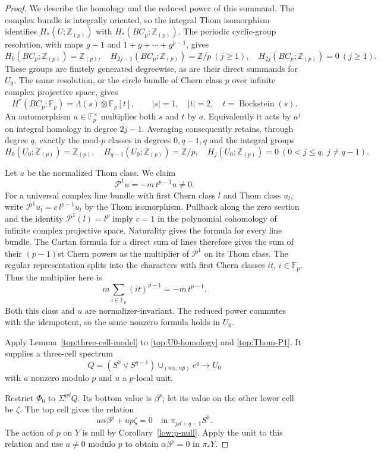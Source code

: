\begin{proof}
We describe the homology and the reduced power of this summand.
The complex bundle is integrally oriented, so the integral Thom
isomorphism identifies $H_*(U;\mathbb Z_{(p)})$ with
$H_*(BC_p;\mathbb Z_{(p)})$. The periodic cyclic-group resolution,
with maps $g-1$ and $1+g+\cdots+g^{p-1}$, gives
\[
 H_0(BC_p;\mathbb Z_{(p)})=\mathbb Z_{(p)},\quad
 H_{2j-1}(BC_p;\mathbb Z_{(p)})=\mathbb Z/p\ (j\geq1),\quad
 H_{2j}(BC_p;\mathbb Z_{(p)})=0\ (j\geq1).
\]
These groups are finitely generated degreewise, as are their
direct summands for $U_0$. The same resolution, or the circle
bundle of Chern class $p$ over infinite complex projective space,
gives
\[
 H^*(BC_p;\mathbb F_p)=\Lambda(s)\otimes\mathbb F_p[t],
 \qquad |s|=1,\quad |t|=2,\quad t=\operatorname{Bockstein}(s).
\]
An automorphism $a\in\mathbb F_p^\times$ multiplies both $s$ and
$t$ by $a$. Equivalently it acts by $a^j$ on integral homology
in degree $2j-1$. Averaging consequently retains, through degree
$q$, exactly the mod-$p$ classes in degrees $0,q-1,q$ and the
integral groups
\begin{equation}
\label{top:U0-homology}
 H_0(U_0;\mathbb Z_{(p)})=\mathbb Z_{(p)},\quad
 H_{q-1}(U_0;\mathbb Z_{(p)})=\mathbb Z/p,
 \quad H_j(U_0;\mathbb Z_{(p)})=0\ (0<j\leq q,\ j\ne q-1).
\end{equation}

Let $u$ be the normalized Thom class. We claim
\begin{equation}
\label{top:Thom-P1}
 \mathcal P^1u=-m\,t^{p-1}u\ne0.
\end{equation}
For a universal complex line bundle with first Chern class $l$
and Thom class $u_l$, write
$\mathcal P^1u_l=c\,l^{p-1}u_l$ by the Thom isomorphism.
Pullback along the zero section and the identity
$\mathcal P^1(l)=l^p$ imply $c=1$ in the polynomial cohomology of
infinite complex projective space. Naturality gives the formula
for every line bundle. The Cartan formula for a direct sum of
lines therefore gives the sum of their $(p-1)$st Chern powers as
the multiplier of $\mathcal P^1$ on its Thom class.
The regular representation splits into the characters with first
Chern classes $it$, $i\in\mathbb F_p$. Thus the multiplier here is
\[
 m\sum_{i\in\mathbb F_p}(it)^{p-1}
 =-m\,t^{p-1}.
\]
Both this class and $u$ are normalizer-invariant. The reduced
power commutes with the idempotent, so the same nonzero formula
holds in $U_0$.

Apply Lemma~\ref{top:three-cell-model} to
\eqref{top:U0-homology} and \eqref{top:Thom-P1}. It supplies a
three-cell spectrum
\[
 Q=(S^0\vee S^{q-1})\cup_{(a\alpha,\,up)}e^q\longrightarrow U_0
\]
with $a$ nonzero modulo $p$ and $u$ a $p$-local unit.

Restrict $\Phi_0$ to $\Sigma^{pd}Q$. Its bottom value is
$\beta^p$; let its value on the other lower cell be $\zeta$.
The top cell gives the relation
\[
 a\alpha\beta^p+up\zeta=0
 \quad\text{in }\pi_{pd+q-1}S^0.
\]
The action of $p$ on $Y$ is null by Corollary~\ref{low:p-null}.
Apply the unit to this relation and use $a\ne0$ modulo $p$ to
obtain $\alpha\beta^p=0$ in $\pi_*Y$.
\end{proof}

